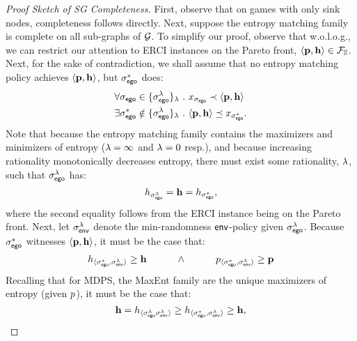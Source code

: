 \begin{proof}[Proof Sketch of SG Completeness]
  First, observe that on games with only sink nodes, completeness
  follows directly.  Next, suppose the entropy matching family is
  complete on all sub-graphs of $\mathcal{G}$. To simplify our proof, observe
  that w.o.l.o.g., we can restrict our attention to ERCI instances
  on the Pareto front, $\langle \mathbf{p},\mathbf{h}\rangle \in \mathcal{F}_{\mathbb{S}}$.
  Next, for the sake of contradiction, we shall assume that no entropy
  matching policy achieves $\langle \mathbf{p},\mathbf{h}\rangle$,
  but $\sigma_{\mathsf{ego}}^*$ does:
  \begin{align}
    &\forall \sched_\pOne \in \{\sched_{\pOne}^\rat\}_\rat~.~ x_{\sched_{\pOne}} \prec \langle \scthreshold, \randomness \rangle\label{eq:reject}\\
    &\exists \sched_\pOne^* \notin \{\sched_{\pOne}^\rat\}_\rat~.~  \langle \scthreshold, \randomness \rangle \preceq x_{\sched_{\pOne}^*}\label{eq:incomplete}.
  \end{align}
  Note that because the entropy matching family contains the maximizers and minimizers
  of entropy ($\lambda = \infty$ and $\lambda = 0$ resp.), and because increasing rationality monotonically decreases entropy,
  there must exist some rationality, $\lambda$, such that $\sigma_{\mathsf{ego}}^\lambda$ has:
  \begin{equation}
    h_{\sigma_{\mathsf{ego}}^\lambda} = \mathbf{h} = h_{\sigma_{\mathsf{ego}}^*},
  \end{equation}
  where the second equality follows from the ERCI instance being on the Pareto front.
  Next, let $\sigma_{\mathsf{env}}^\lambda$ denote the min-randomness
  $\mathsf{env}$-policy given $\sigma_{\mathsf{ego}}^{\lambda}$. Because $\sigma_{\mathsf{ego}}^*$
  witnesses $\langle\mathbf{p}, \mathbf{h}\rangle$, it must be the case
  that:
  \begin{equation}\label{eq:pareto_bound_for_rat}
    \rndp_{\langle \sched_\pOne^*, \sched_\pTwo^\rat \rangle} \geq \randomness
    \hspace{3em} \wedge \hspace{3em}
    \scp_{\langle \sched_\pOne^*, \sched_\pTwo^\rat\rangle} \geq \scthreshold
  \end{equation}
  Recalling that for MDPS, the MaxEnt family are the unique maximizers of entropy (given $p$),
  it must be the case that:
  \begin{equation}
    \randomness = \rndp_{\langle \sched_\pOne^\rat \sched_\pTwo^\rat \rangle} \geq  \rndp_{\langle \sched_\pOne^*, \sched_\pTwo^\rat \rangle}\geq \randomness,

\end{equation}
\end{proof}
